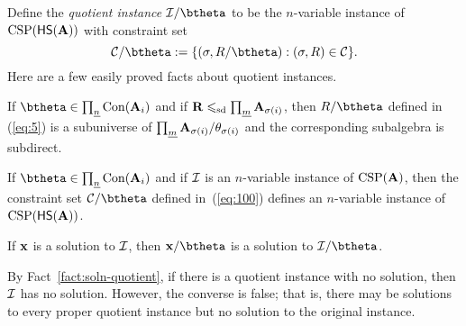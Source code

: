 Define the \emph{quotient instance} $\sI/\btheta$ to be the $n$-variable instance
of $\operatorname{CSP}(\mathsf{H} \mathsf{S} (\mathbf{A}))$ with constraint set
\begin{equation}
  \label{eq:100}
  \mathcal{C}/\btheta:=\{(\sigma, R/\btheta): (\sigma, R) \in \mathcal{C}\}.
\end{equation}
Here are a few easily proved facts about quotient instances.
\begin{Fact}
  \label{fact:quotient-sdp}
  If $\btheta \in \prod_{\nn}\Con (\bA_i)$ and if
  $\mathbf{R} \leqslant_{\mathrm{sd}} \prod_{\underline{m}} \mathbf{A}_{\sigma(i)}$, then $R/\btheta$ defined in (\ref{eq:5})
  is a subuniverse of $\prod_{\underline{m}}\mathbf{A}_{\sigma(i)}/\theta_{\sigma(i)}$
  and the corresponding subalgebra is subdirect.
\end{Fact}

\begin{Fact}
  \label{fact:quotient-instance}
  If $\btheta \in \prod_{\nn}\Con (\bA_i)$ and if
  $\mathcal{I}$ is an $n$-variable instance of $\operatorname{CSP}(\mathbf{A})$, then
  the constraint set $\mathcal C/\btheta$ defined in~(\ref{eq:100})
  defines an $n$-variable instance of $\operatorname{CSP}(\mathsf{H} \mathsf{S} (\mathbf{A}))$.
\end{Fact}

\begin{Fact}
  \label{fact:soln-quotient}
  If $\mathbf{x}$ is a solution to $\mathcal{I}$, then $\bx/\btheta$ is a solution to $\sI/\btheta$.
\end{Fact}
\noindent By Fact~\ref{fact:soln-quotient}, if there is a
quotient instance with no solution, then $\mathcal{I}$ has no solution. However, the converse is false;
that is, there may be solutions to every proper quotient instance but no solution to the original instance.

